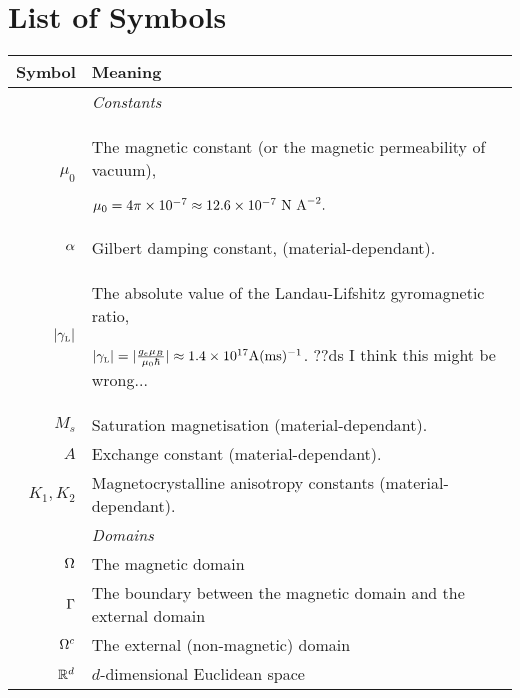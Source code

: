

\chapter*{List of Symbols}

\renewcommand{\arraystretch}{1.2}

\newcommand{\hlinegap}[1]{\noalign{\medskip} & \emph{#1} \\ \hline \noalign{\smallskip}}

\begin{tabular}{r  p{12cm}} %

  \textbf{Symbol} & \textbf{Meaning} \\
  \hline\hline %

  \hlinegap{Constants}
  $\mu_0$ & The magnetic constant (or the magnetic permeability of vacuum),

  $\mu_0 = 4 \pi \times 10^{-7} \approx 12.6 \times 10^{-7} \text{ N A}^{-2}.$ \\
  $\alpha$ & Gilbert damping constant, (material-dependant). \\
  ${\lvert \gamma_{\text{\tiny{L}}} \rvert}$ & The absolute value of the Landau-Lifshitz gyromagnetic ratio,

  ${\lvert \gamma_{\text{\tiny{L}}} \rvert} = \lvert  \frac{g_e \mu_B}{\mu_0 \hbar}  \rvert \approx 1.4 \times 10^{17} {\text{A}(\text{ms})^{-1}}$. ??ds I think this might be wrong... \\

  $M_s$ & Saturation magnetisation (material-dependant). \\
  $A$ & Exchange constant (material-dependant). \\
  $K_1, K_2$ & Magnetocrystalline anisotropy constants (material-dependant). \\

  \hlinegap{Domains}
  $\Omega$ & The magnetic domain \\
  ${\Gamma}$ & The boundary between the magnetic domain and the external domain \\
  ${\Omega^c}$ & The external (non-magnetic) domain \\
  $\mathbb{R}^d$ & $d$-dimensional Euclidean space \\


\end{tabular}
